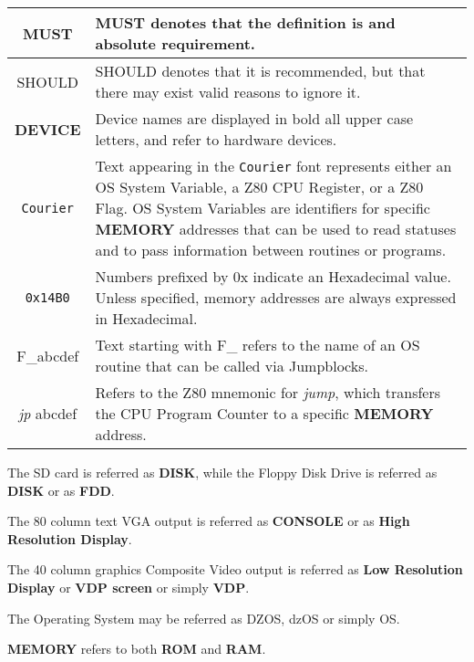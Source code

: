 \documentclass[a4paper,11pt]{article}
\begin{document}
    \begin{center}
        \begin{tabular}{c m{9cm}}
            \hline
            MUST & MUST denotes that the definition is and absolute
            requirement.\\
            \hline
            SHOULD & SHOULD denotes that it is recommended, but that there may
            exist valid reasons to ignore it.\\
            \hline
            \textbf{DEVICE} & Device names are displayed in bold all upper case 
            letters, and refer to hardware devices.\\
            \hline
            \texttt{Courier} & Text appearing in the \texttt{Courier} font 
            represents either an OS System Variable, a Z80 CPU Register,
            or a Z80 Flag. OS System Variables are identifiers for specific
            \textbf{MEMORY} addresses that can be used to read statuses and to
            pass information between routines or programs.\\
            \hline
            \texttt{0x14B0} & Numbers prefixed by 0x indicate an Hexadecimal value.
            Unless specified, memory addresses are always expressed in
            Hexadecimal.\\
            \hline
            F\_abcdef & Text starting with F\_ refers to the name of an OS 
            routine that can be called via Jumpblocks. \\
            \hline
            \textit{jp} abcdef & Refers to the Z80 mnemonic for \textit{jump},
            which transfers the CPU Program Counter to a specific \textbf{MEMORY}
            address.\\
            \hline
        \end{tabular}
    \end{center}

    The SD card is referred as \textbf{DISK}, while the Floppy Disk Drive is
    referred as \textbf{DISK} or as \textbf{FDD}.

    The 80 column text VGA output is referred as \textbf{CONSOLE} or as
    \textbf{High Resolution Display}.

    The 40 column graphics Composite Video output is referred as \textbf{Low
    Resolution Display} or \textbf{VDP screen} or simply \textbf{VDP}.

    The Operating System may be referred as DZOS, dzOS or simply OS.

    \textbf{MEMORY} refers to both \textbf{ROM} and \textbf{RAM}.
\end{document}
